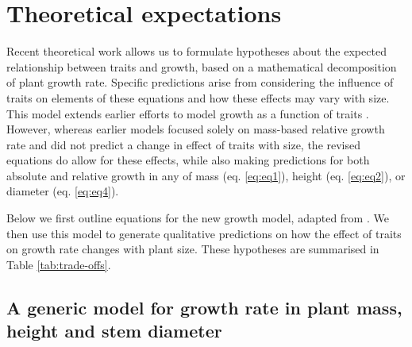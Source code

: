 \documentclass[a4paper,11pt]{article}
\begin{document}
\section*{Theoretical expectations}\label{theory}

Recent theoretical work \citep{Falster:2011ii} allows us to formulate hypotheses about the expected relationship between traits and growth, based on a mathematical decomposition of plant growth rate. Specific predictions arise from considering the influence of traits on elements of these equations and how these effects may vary with size. This model extends earlier efforts to model growth as a function of traits \citep{Lambers:1992bj,Cornelissen:1996hf,Wright:2000kw,Enquist:2007ek}. However, whereas earlier models focused solely on mass-based relative growth rate and did not predict a change in effect of traits with size, the revised equations do allow for these effects, while also making predictions for both absolute and relative growth in any of mass (eq. \ref{eq:eq1}), height (eq. \ref{eq:eq2}), or diameter (eq. \ref{eq:eq4}).

Below we first outline equations for the new growth model, adapted from \citet{Falster:2011ii}. We then use this model to generate qualitative predictions on how the effect of traits on growth rate changes with plant size. These hypotheses are summarised in Table \ref{tab:trade-offs}.

\subsection*{A generic model for growth rate in plant mass, height and stem diameter}\label{sec:growth}
\end{document}
